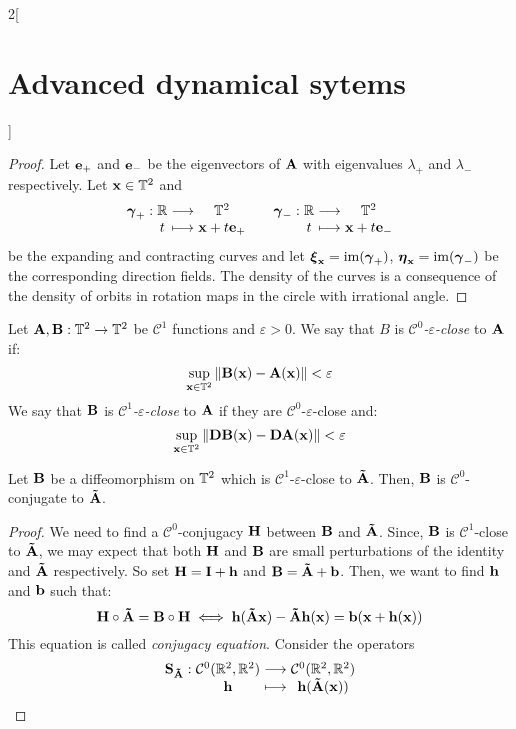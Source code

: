 \documentclass[../../../main_math.tex]{subfiles}
\begin{document}
\begin{multicols}{2}[\section{Advanced dynamical sytems}]
\begin{theorem}
  \end{theorem}
  \begin{proof}
    Let $\boldsymbol{\mathrm{e}}_+$ and $\boldsymbol{\mathrm{e}}_-$ be the eigenvectors of $\boldsymbol{\mathrm{A}}$ with eigenvalues $\lambda_+$ and $\lambda_-$ respectively. Let $\boldsymbol{\mathrm{x}}\in \mathbb{T}^2$ and
    $$
      \function{\vf\gamma_+}{\RR}{\TT^2}{t}{\vf{x}+t \vf{e}_+}\quad
      \function{\vf\gamma_-}{\RR}{\TT^2}{t}{\vf{x}+t \vf{e}_-}
    $$
    be the expanding and contracting curves and let $\boldsymbol{\mathrm{\xi}}_{\boldsymbol{\mathrm{x}}}=\operatorname{im}(\boldsymbol{\mathrm{\gamma}}_+)$, $\boldsymbol{\mathrm{\eta}}_{\boldsymbol{\mathrm{x}}}=\operatorname{im}(\boldsymbol{\mathrm{\gamma}}_-)$ be the corresponding direction fields. The density of the curves is a consequence of the density of orbits in rotation maps in the circle with irrational angle.
  \end{proof}
  \begin{definition}
    Let $\boldsymbol{\mathrm{A}},\boldsymbol{\mathrm{B}}:\mathbb{T}^2\rightarrow \mathbb{T}^2$ be $\mathcal{C}^1$ functions and $\varepsilon>0$. We say that $B$ is \emph{$\mathcal{C}^0$-$\varepsilon$-close} to $\boldsymbol{\mathrm{A}}$ if:
    $$
      \sup_{\boldsymbol{\mathrm{x}}\in \mathbb{T}^2}\left\|\boldsymbol{\mathrm{B}}(\boldsymbol{\mathrm{x}})-\boldsymbol{\mathrm{A}}(\boldsymbol{\mathrm{x}})\right\|<\varepsilon
    $$
    We say that $\boldsymbol{\mathrm{B}}$ is \emph{$\mathcal{C}^1$-$\varepsilon$-close} to $\boldsymbol{\mathrm{A}}$ if they are $\mathcal{C}^0$-$\varepsilon$-close and:
    $$
      \sup_{\boldsymbol{\mathrm{x}}\in \mathbb{T}^2}\left\|\boldsymbol{\mathrm{DB}}(\boldsymbol{\mathrm{x}})-\boldsymbol{\mathrm{DA}}(\boldsymbol{\mathrm{x}})\right\|<\varepsilon
    $$
  \end{definition}
  \begin{theorem}
    Let $\boldsymbol{\mathrm{B}}$ be a diffeomorphism on $\mathbb{T}^2$ which is $\mathcal{C}^1$-$\varepsilon$-close to $\boldsymbol{\mathrm{\tilde{A}}}$. Then, $\boldsymbol{\mathrm{B}}$ is $\mathcal{C}^0$-conjugate to $\boldsymbol{\mathrm{\tilde{A}}}$.
  \end{theorem}
  \begin{proof}
    We need to find a $\mathcal{C}^0$-conjugacy $\boldsymbol{\mathrm{H}}$ between $\boldsymbol{\mathrm{B}}$ and $\boldsymbol{\mathrm{\tilde{A}}}$. Since, $\boldsymbol{\mathrm{B}}$ is $\mathcal{C}^1$-close to $\boldsymbol{\mathrm{\tilde{A}}}$, we may expect that both $\boldsymbol{\mathrm{H}}$ and $\boldsymbol{\mathrm{B}}$ are small perturbations of the identity and $\boldsymbol{\mathrm{\tilde{A}}}$ respectively. So set $\boldsymbol{\mathrm{H}}=\boldsymbol{\mathrm{I}}+\boldsymbol{\mathrm{h}}$ and $\boldsymbol{\mathrm{B}}=\boldsymbol{\mathrm{\tilde{A}}}+\boldsymbol{\mathrm{b}}$. Then, we want to find $\boldsymbol{\mathrm{h}}$ and $\boldsymbol{\mathrm{b}}$ such that:
    $$
      \boldsymbol{\mathrm{H}}\circ \boldsymbol{\mathrm{\tilde{A}}}=\boldsymbol{\mathrm{B}}\circ \boldsymbol{\mathrm{H}}\iff
      \boldsymbol{\mathrm{h}}(\boldsymbol{\mathrm{\tilde{A}x}})-\boldsymbol{\mathrm{\tilde{A}}} \boldsymbol{\mathrm{h}}(\boldsymbol{\mathrm{x}})=\boldsymbol{\mathrm{b}}(\boldsymbol{\mathrm{x}}+\boldsymbol{\mathrm{h}}(\boldsymbol{\mathrm{x}}))
    $$
    This equation is called \emph{conjugacy equation}. Consider the operators
    \begin{gather*}
      \function{\vf{S}_{\vf{\tilde{A}}}}{\mathcal{C}^0(\RR^2,\RR^2)}{\mathcal{C}^0(\RR^2,\RR^2)}{\vf{h}}{\vf{h}(\vf{\tilde{A}}(\vf{x}))}\\

\end{gather*}
\end{proof}
\end{multicols}
\end{document}
